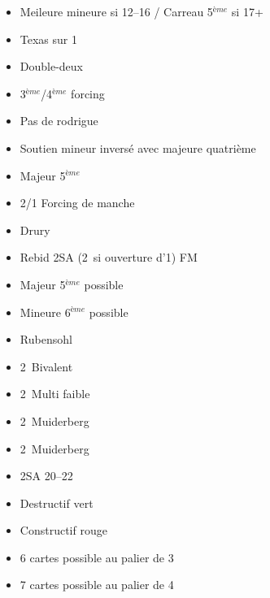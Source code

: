 \documentclass[a4paper, oneside, 11pt]{report}
\begin{document}
		\SSection{1\trefle/1\carreau}
            \begin{itemize}
                \item Meileure mineure  si 12--16 / Carreau 5$^{ème}$ si 17+
                \item Texas sur 1\trefle
                \item Double-deux
                \item 3$^{ème}$/4$^{ème}$ forcing
                \item Pas de rodrigue
                \item Soutien mineur inversé avec majeure quatrième\\
            \end{itemize}
			
		\SSection{1\coeur/1\pique}
            \begin{itemize}
                \item Majeur 5$^{ème}$
                \item 2/1 Forcing de manche
                \item Drury
                \item Rebid 2SA (2\pique\ si ouverture d'1\coeur) FM\\
            \end{itemize}
			
            \begin{itemize}
                \item Majeur 5$^{ème}$ possible
                \item Mineure 6$^{ème}$ possible
                \item Rubensohl\\
            \end{itemize}

            \begin{itemize}
                \item 2\trefle\ Bivalent
                \item 2\carreau\ Multi faible
                \item 2\coeur\ Muiderberg
                \item 2\pique\ Muiderberg
                \item 2SA 20--22\\
            \end{itemize}

            \begin{itemize}
                \item Destructif vert
                \item Constructif rouge
                \item 6 cartes possible au palier de 3
                \item 7 cartes possible au palier de 4\\
            \end{itemize}
\end{document}
